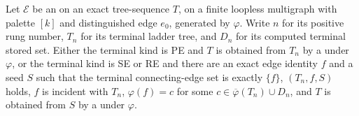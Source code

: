 \begin{helper}
Let $\mathcal E$ be an  on an exact
tree-sequence $T$, on a finite loopless multigraph with palette $[k]$ and
distinguished edge $e_0$, generated by $\varphi$.  Write $n$ for its
positive rung number, $T_n$ for its terminal ladder tree, and $D_n$ for
its computed terminal stored set.  Either the terminal kind is PE and
$T$ is obtained from $T_n$ by a 
under $\varphi$, or the terminal kind is SE or RE and there are an exact
edge identity $f$ and a seed $S$ such that the terminal connecting-edge
set is exactly $\{f\}$, $(T_n,f,S)$
holds, $f$ is incident with $T_n$, $\varphi(f)=c$ for some
$c\in\overline\varphi(T_n)\cup D_n$, and $T$ is obtained from $S$ by
a  under $\varphi$.
\end{helper}

